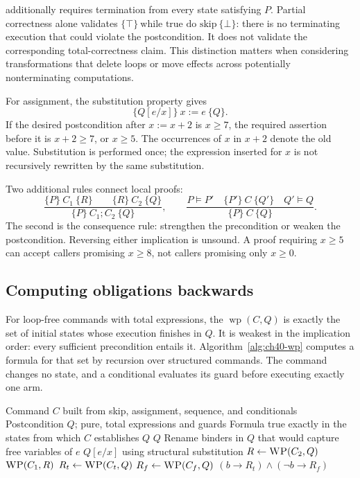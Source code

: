  additionally requires termination from every state satisfying $P$.
Partial correctness alone validates $\{\top\}\ \text{while true do skip}\ \{\bot\}$: there is no terminating execution that could violate the postcondition.
It does not validate the corresponding total-correctness claim.
This distinction matters when considering transformations that delete loops or move effects across potentially nonterminating computations.

For assignment, the substitution property gives
\[
  \{Q[e/x]\}\ x:=e\ \{Q\}.
\]
If the desired postcondition after $x:=x+2$ is $x\geq7$, the required assertion before it is $x+2\geq7$, or $x\geq5$.
The occurrences of $x$ in $x+2$ denote the old value.
Substitution is performed once; the expression inserted for $x$ is not recursively rewritten by the same substitution.

Two additional rules connect local proofs:
\[
 \frac{\{P\}\ C_1\ \{R\}\qquad\{R\}\ C_2\ \{Q\}}
      {\{P\}\ C_1;C_2\ \{Q\}},
 \qquad
 \frac{P\models P'\quad\{P'\}\ C\ \{Q'\}\quad Q'\models Q}
      {\{P\}\ C\ \{Q\}}.
\]
The second is the consequence rule: strengthen the precondition or weaken the postcondition.
Reversing either implication is unsound.
A proof requiring $x\geq5$ can accept callers promising $x\geq8$, not callers promising only $x\geq0$.

\subsection{Computing obligations backwards}
\label{sec:ch40-backward}

For loop-free commands with total expressions, the  $\operatorname{wp}(C,Q)$ is exactly the set of initial states whose execution finishes in $Q$.
It is weakest in the implication order: every sufficient precondition entails it.
Algorithm~\ref{alg:ch40-wp} computes a formula for that set by recursion over structured commands.
The command  changes no state, and a conditional evaluates its guard before executing exactly one arm.

\begin{algorithm}
\caption{Construct a weakest precondition for a loop-free command.}
\label{alg:ch40-wp}
\begin{pseudocode}
\Require Command $C$ built from skip, assignment, sequence, and conditionals
\Require Postcondition $Q$; pure, total expressions and guards
\Ensure Formula true exactly in the states from which $C$ establishes $Q$
    \State \Return $Q$
    \State Rename binders in $Q$ that would capture free variables of $e$
    \State \Return $Q[e/x]$ using structural substitution
    \State $R\gets\Call{WP}{C_2,Q}$
    \State \Return $\Call{WP}{C_1,R}$
  \Else {}
    \State $R_t\gets\Call{WP}{C_t,Q}$
    \State $R_f\gets\Call{WP}{C_f,Q}$
    \State \Return $(b\rightarrow R_t)\land(\neg b\rightarrow R_f)$
  \EndIf
\EndFunction
\end{pseudocode}
\end{algorithm}

